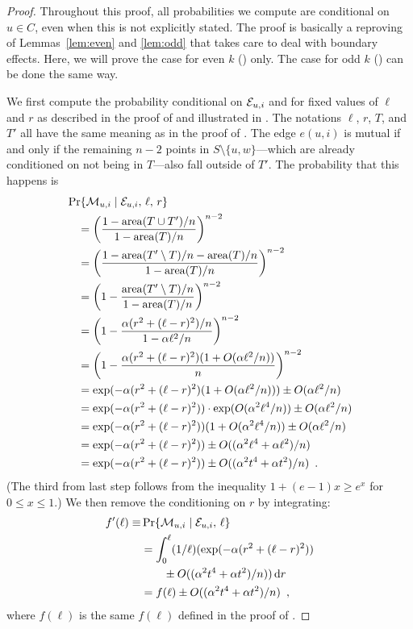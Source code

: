 \documentclass[twoside,leqno,twocolumn]{article}
\DeclareMathOperator{\area}{area}
\begin{document}
\begin{proof}
Throughout this proof, all probabilities we compute are conditional on
$u\in C$, even when this is not explicitly stated.  The proof is basically
a reproving of Lemmas~\ref{lem:even} and \ref{lem:odd} that takes care to
deal with boundary effects.  Here, we will prove the case for even $k$
() only.  The case for odd $k$ () can be done
the same way.

We first compute the probability conditional on $\mathcal{E}_{u,i}$ and for fixed
values of $\ell$ and $r$ as described in the proof of 
and illustrated in .  The notations $\ell$, $r$, $T$,
and $T'$ all have the same meaning as in the proof of .
The edge $e(u,i)$ is mutual if and only if the remaining $n-2$ points
in $S\setminus\{u,w\}$---which are already conditioned on not being in
$T$---also fall outside of $T'$.  The probability that this happens is
\begin{align*}
   & \Pr\{\mui\mid\eui,\,\ell,\, r\} \\
        &\quad = \left(\frac{1-\area(T\cup T')/n}{1-\area(T)/n}\right)^{n-2} 
		\notag \\
        &\quad = \left(\frac{1-\area(T'\setminus T)/n - \area(T)/n}
             {1-\area(T)/n}\right)^{n-2} \notag \\
        &\quad = \left(1-\frac{\area(T'\setminus T)/n}{1-\area(T)/n}\right)^{n-2}
		\notag  \\
        &\quad = \left(1-\frac{\alpha(r^2+(\ell-r)^2)/n}
                       {1-\alpha\ell^2/n}\right)^{n-2} \notag \\
        &\quad = \left(1-\frac{\alpha(r^2+(\ell-r)^2)
               (1+O(\alpha\ell^2/n))}{n} \right)^{n-2} \notag \\
        &\quad = \exp(-\alpha(r^2+(\ell-r)^2)(1+O(\alpha\ell^2/n)))
         \pm O(\alpha\ell^2/n) \notag \\
        &\quad = \exp(-\alpha(r^2+(\ell-r)^2))
            \cdot\exp(O(\alpha^2\ell^4/n)) \pm O(\alpha\ell^2/n) \notag \\
        &\quad = \exp(-\alpha(r^2+(\ell-r)^2))(1+O(\alpha^2\ell^4/n)) 
            \pm O(\alpha\ell^2/n) \eqlabel{blech} \\
        &\quad = \exp(-\alpha(r^2+(\ell-r)^2))
            \pm O((\alpha^2\ell^4+\alpha\ell^2)/n) \notag \\
        &\quad = \exp(-\alpha(r^2+(\ell-r)^2))
            \pm O((\alpha^2 t^4+\alpha t^2)/n) \enspace . \notag
\end{align*}
(The third from last step follows from the inequality $1+(e-1)x \ge e^{x}$
for $0\le x\le 1$.)  We then remove the conditioning on $r$ by integrating:
\begin{align*}
   f'(\ell) \equiv & \Pr\{\mathcal{M}_{u,i}\mid\mathcal{E}_{u,i},\,\ell\} \\
     & = \int_0^\ell(1/\ell)(\exp(-\alpha(r^2+(\ell-r)^2)) \\
          &\qquad \pm O((\alpha^2 t^4+\alpha t^2)/n))\,\mathrm{d}r \\
     & = f(\ell) \pm O((\alpha^2 t^4+\alpha t^2)/n) \enspace ,
\end{align*}
where $f(\ell)$ is the same $f(\ell)$ defined in the proof of .


\end{proof}
\end{document}
